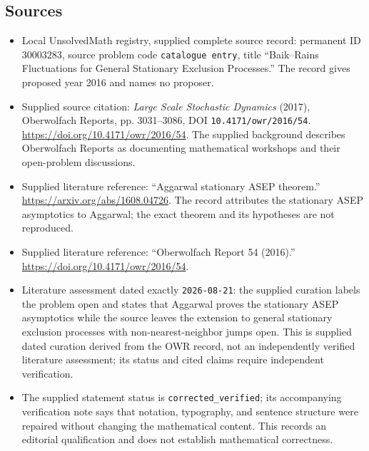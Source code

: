 \documentclass[11pt]{article}
\begin{document}
\subsection{Sources}
\begin{itemize}
\item Local UnsolvedMath registry, supplied complete source record: permanent ID \(30003283\), source problem code \texttt{catalogue entry}, title ``Baik--Rains Fluctuations for General Stationary Exclusion Processes.'' The record gives proposed year 2016 and names no proposer.
\item Supplied source citation: \emph{Large Scale Stochastic Dynamics} (2017), Oberwolfach Reports, pp. 3031--3086, DOI \texttt{10.4171/owr/2016/54}. \url{https://doi.org/10.4171/owr/2016/54}. The supplied background describes Oberwolfach Reports as documenting mathematical workshops and their open-problem discussions.
\item Supplied literature reference: ``Aggarwal stationary ASEP theorem.'' \url{https://arxiv.org/abs/1608.04726}. The record attributes the stationary ASEP asymptotics to Aggarwal; the exact theorem and its hypotheses are not reproduced.
\item Supplied literature reference: ``Oberwolfach Report 54 (2016).'' \url{https://doi.org/10.4171/owr/2016/54}.
\item Literature assessment dated exactly \texttt{2026-08-21}: the supplied curation labels the problem open and states that Aggarwal proves the stationary ASEP asymptotics while the source leaves the extension to general stationary exclusion processes with non-nearest-neighbor jumps open. This is supplied dated curation derived from the OWR record, not an independently verified literature assessment; its status and cited claims require independent verification.
\item The supplied statement status is \texttt{corrected\_verified}; its accompanying verification note says that notation, typography, and sentence structure were repaired without changing the mathematical content. This records an editorial qualification and does not establish mathematical correctness.
\end{itemize}
\end{document}
